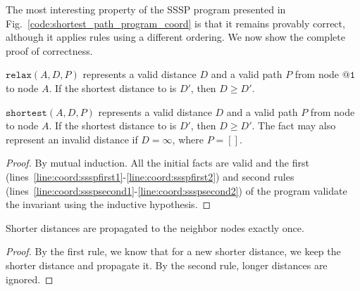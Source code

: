 The most interesting property of the SSSP program presented in
Fig.~\ref{code:shortest_path_program_coord} is that it remains provably correct,
although it applies rules using a different ordering. We now show the complete
proof of correctness.

\begin{invariant}[Distance]

   $\mathtt{relax}(A, D, P)$ represents a valid distance $D$ and a valid path
   $P$ from node $\mathtt{@1}$ to node $A$. If the shortest distance to
 is $D'$, then $D \geq D'$.

$\mathtt{shortest}(A, D, P)$ represents a valid distance $D$ and a valid
path $P$ from node  to node $A$. If the shortest
distance to  is $D'$, then $D \geq D'$. The  fact may
also represent an invalid distance if $D = \infty$, where $P = []$.

\end{invariant}

\begin{proof}

By mutual induction. All the initial facts are valid and the first
(lines~\ref{line:coord:ssspfirst1}-\ref{line:coord:ssspfirst2}) and second rules
(lines~\ref{line:coord:ssspsecond1}-\ref{line:coord:ssspsecond2}) of the program
validate the invariant using the inductive hypothesis.

\end{proof}

\begin{lemma}[Relaxation]
Shorter distances are propagated to the neighbor nodes exactly once.
\end{lemma}

\begin{proof}
By the first rule, we know that for a new shorter distance, we keep the shorter
distance and propagate it. By the second rule, longer distances are ignored.
\end{proof}

